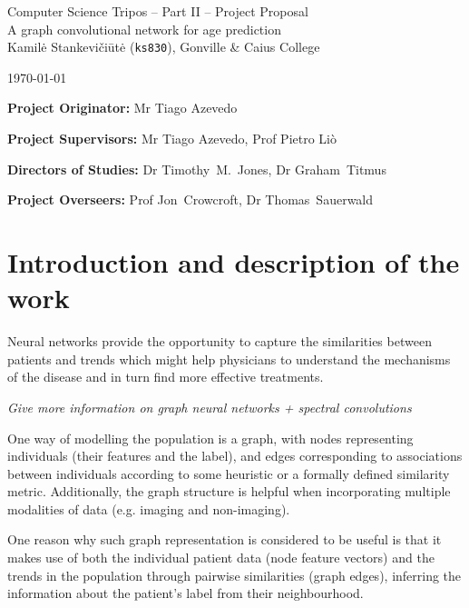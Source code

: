 \documentclass[12pt,a4paper,twoside]{article}
\begin{document}
\begin{center}
\Large
Computer Science Tripos -- Part II -- Project Proposal\\[4mm]
\LARGE
A graph convolutional network for age prediction \\[4mm]

\large
Kamilė Stankevičiūtė (\texttt{ks830}), Gonville \& Caius College

\today %
\end{center}

\vspace{5mm}
\textbf{Project Originator:} Mr Tiago Azevedo

\textbf{Project Supervisors:} Mr Tiago Azevedo, Prof Pietro Liò

\textbf{Directors of Studies:} Dr Timothy~M.~Jones, Dr Graham~Titmus

\textbf{Project Overseers:} Prof Jon~Crowcroft, Dr Thomas~Sauerwald


\section*{Introduction and description of the work}

Neural networks provide the opportunity to capture the similarities between patients and trends which might help physicians to understand the mechanisms of the disease and in turn find more effective treatments.

\textit{Give more information on graph neural networks + spectral convolutions}

One way of modelling the population is a graph, with nodes representing individuals (their features and the label), and edges corresponding to associations between individuals according to some heuristic or a formally defined similarity metric. Additionally, the graph structure is helpful when incorporating multiple modalities of data (e.g. imaging and non-imaging).


One reason why such graph representation is considered to be useful is that it makes use of both the individual patient data (node feature vectors) and the trends in the population through pairwise similarities (graph edges), inferring the information about the patient's label from their neighbourhood. 
\end{document}
